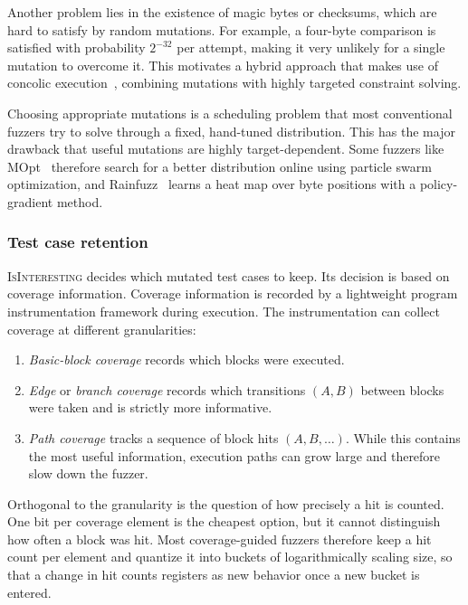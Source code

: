 Another problem lies in the existence of magic bytes or checksums, which are hard to satisfy by random mutations.
For example, a four-byte comparison is satisfied with probability $2^{-32}$ per attempt, making it very unlikely for a single mutation to overcome it.
This motivates a hybrid approach that makes use of concolic execution~\cite{stephens_driller_2016}, combining mutations with highly targeted constraint solving.

Choosing appropriate mutations is a scheduling problem that most conventional fuzzers try to solve through a fixed, hand-tuned distribution.
This has the major drawback that useful mutations are highly target-dependent.
Some fuzzers like MOpt~\cite{lyu_mopt_nodate} therefore search for a better distribution online using particle swarm
optimization, and Rainfuzz~\cite{binosi_rainfuzz_2023} learns a heat map over byte positions with
a policy-gradient method.

\subsubsection{Test case retention}

\textsc{IsInteresting} decides which mutated test cases to keep.
Its decision is based on coverage information.
Coverage information is recorded by a lightweight program instrumentation framework during execution.
The instrumentation can collect coverage at different granularities:

\begin{enumerate}
  \item \emph{Basic-block coverage}
    records which blocks were executed.

  \item \emph{Edge} or \emph{branch coverage} records which transitions $(A,B)$
    between blocks were taken and is strictly more informative.

  \item \emph{Path coverage} tracks a sequence of block hits $(A,B,\dots)$.
    While this contains the most useful information, execution paths
    can grow large and therefore slow down the fuzzer.
\end{enumerate}

Orthogonal to the granularity is the question of how precisely a hit is counted.
One bit per coverage element is the cheapest option, but it cannot distinguish how often a block was hit.
Most coverage-guided fuzzers therefore keep a hit count per element and quantize it into
buckets of logarithmically scaling size, so that a change in hit counts registers as new behavior once a new bucket is entered.


